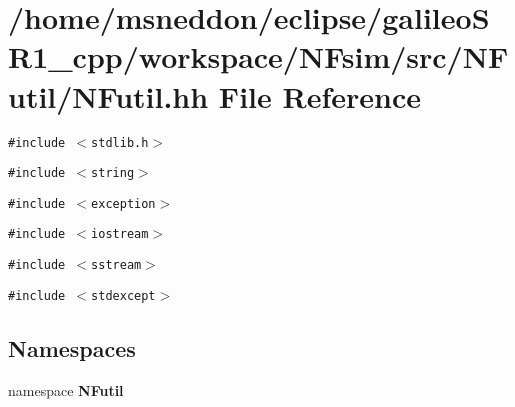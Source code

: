 \section{/home/msneddon/eclipse/galileoSR1\_\-cpp/workspace/NFsim/src/NFutil/NFutil.hh File Reference}
\label{NFutil_8hh}


{\tt \#include $<$stdlib.h$>$}\par
{\tt \#include $<$string$>$}\par
{\tt \#include $<$exception$>$}\par
{\tt \#include $<$iostream$>$}\par
{\tt \#include $<$sstream$>$}\par
{\tt \#include $<$stdexcept$>$}\par
\subsection*{Namespaces}
\begin{CompactItemize}
\item 
namespace {\bf NFutil}
\end{CompactItemize}
